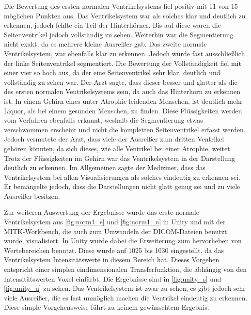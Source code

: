Die Bewertung des ersten normalen Ventrikelsystems fiel positiv mit 11 von 15 möglichen Punkten aus. Das Ventrikelsystem war als solches klar und deutlich zu erkennen, jedoch fehlte ein Teil der Hinterhörner. Bis auf diese waren die Seitenventrikel jedoch vollständig zu sehen. Weiterhin war die Segmentierung nicht exakt, da es mehrere kleine Ausreißer gab.
\newline
Das zweite normale Ventrikelsystem, war ebenfalls klar zu erkennen. Jedoch wurde fast ausschließlich der linke Seitenventrikel segmentiert. Die Bewertung der Vollständigkeit fiel mit einer vier so hoch aus, da der eine Seitenventrikel sehr klar, deutlich und vollständig zu sehen war. Der Arzt sagte, dass dieser besser und glatter als die des ersten normalen Ventrikelsystems sein, da auch das Hinterhorn zu erkennen ist. 
\newline
In einem Gehirn eines unter Atrophie leidenden Menschen, ist deutlich mehr Liquor, als bei einem gesunden Menschen, zu finden. Diese Flüssigkeiten werden vom Verfahren ebenfalls erkannt, weshalb die Segmentierung etwas verschwommen erscheint und nicht die kompletten Seitenventrikel erfasst werden. Jedoch vermutete der Arzt, dass viele der Ausreißer zum dritten Ventrikel gehören könnten, da sich dieses, wie alle Ventrikel bei einer Atrophie, weitet. Trotz der Flüssigkeiten im Gehirn war das Ventrikelsystem in der Darstellung deutlich zu erkennen.
\newline
 Im Allgemeinen sagte der Mediziner, dass das Ventrikelsystem bei allen Visualisierungen als solches eindeutig zu erkennen sei. Er bemängelte jedoch, dass die Darstellungen nicht glatt genug sei und zu viele Ausreißer besitzen.


Zur weiteren Auswertung der Ergebnisse wurde das erste normale Ventrikelsystem aus \autoref{fig:norm1_s} und \autoref{fig:norm1_u} in Unity und mit der MITK-Workbench, die auch zum Umwandeln der DICOM-Dateien benutzt wurde, visualisiert.
\newline
In Unity wurde dabei die Erweiterung zum hervorheben von Wertebereichen benutzt. Diese wurde auf 1025 bis 1030 eingestellt, da das Ventrikelsystem Intensitätswerte in diesem Bereich hat. Dieses Vorgehen entspricht einer simplen eindimensionalen Transferfunktion, die abhängig von den Intensitätswerten Voxel einfärbt.
\newline
Die Ergebnisse sind in \autoref{fig:unity_s} und \autoref{fig:unity_u} zu sehen. Das Ventrikelsystem ist zwar zu sehen, es gibt jedoch sehr viele Ausreißer, die es fast unmöglich machen die Ventrikel eindeutig zu erkennen. Diese simple Vorgehensweise führt zu keinem gewünschtem Ergebnis.


